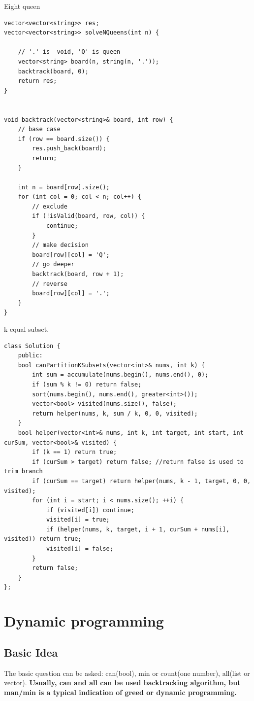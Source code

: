 \documentclass[a4paper,11pt,twoside]{book}
\begin{document}
	\par Eight queen
	
\begin{lstlisting}
vector<vector<string>> res;
vector<vector<string>> solveNQueens(int n) {
	
	// '.' is  void, 'Q' is queen
	vector<string> board(n, string(n, '.'));
	backtrack(board, 0);
	return res;
}


void backtrack(vector<string>& board, int row) {
	// base case
	if (row == board.size()) {
		res.push_back(board);
		return;
	}
	
	int n = board[row].size();
	for (int col = 0; col < n; col++) {
		// exclude
		if (!isValid(board, row, col)) {
			continue;
		}
		// make decision
		board[row][col] = 'Q';
		// go deeper
		backtrack(board, row + 1);
		// reverse
		board[row][col] = '.';
	}
}	
\end{lstlisting}	
	


	\par k equal subset.
	
\begin{lstlisting}
class Solution {
	public:
	bool canPartitionKSubsets(vector<int>& nums, int k) {
		int sum = accumulate(nums.begin(), nums.end(), 0);
		if (sum % k != 0) return false;
		sort(nums.begin(), nums.end(), greater<int>());
		vector<bool> visited(nums.size(), false);
		return helper(nums, k, sum / k, 0, 0, visited);
	}
	bool helper(vector<int>& nums, int k, int target, int start, int curSum, vector<bool>& visited) {
		if (k == 1) return true;
		if (curSum > target) return false; //return false is used to trim branch
		if (curSum == target) return helper(nums, k - 1, target, 0, 0, visited);  
		for (int i = start; i < nums.size(); ++i) {
			if (visited[i]) continue;
			visited[i] = true;
			if (helper(nums, k, target, i + 1, curSum + nums[i], visited)) return true;
			visited[i] = false;
		}
		return false;
	}
};	
\end{lstlisting}	
	

\section{Dynamic programming}
\subsection{Basic Idea}
	
	\par The basic question can be asked: can(bool), min or count(one number), all(list or vector). \textbf{Usually, can and all can be used backtracking algorithm, but man/min is a typical indication of greed or dynamic programming.}
	
\end{document}
